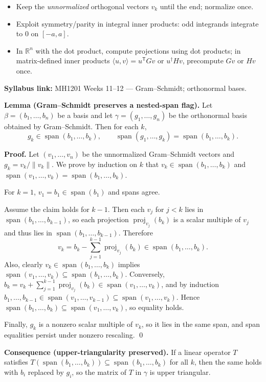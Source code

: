 \begin{examtip}[title={Exam Focus: running Gram--Schmidt efficiently}]
\begin{itemize}[leftmargin=*]
\item Keep the \emph{unnormalized} orthogonal vectors $v_k$ until the end; normalize once.
\item Exploit symmetry/parity in integral inner products: odd integrands integrate to $0$ on $[-a,a]$.
\item In $\mathbb{R}^n$ with the dot product, compute projections using dot products; in matrix-defined inner products $\langle u,v\rangle=u^{\mathsf T}Gv$ or $u^\dagger Hv$, precompute $Gv$ or $Hv$ once.
\end{itemize}
\end{examtip}

\begin{extension}[title={Extension (Tutorial 10, Question 2, Method 1)}]
\textbf{Syllabus link:} MH1201 Weeks 11--12 --- Gram--Schmidt; orthonormal bases.

\textbf{Lemma (Gram--Schmidt preserves a nested-span flag).}
Let $\beta=(b_1,\dots,b_n)$ be a basis and let $\gamma=(g_1,\dots,g_n)$ be the orthonormal basis obtained by Gram--Schmidt.
Then for each $k$,
\[
g_k\in \operatorname{span}(b_1,\dots,b_k),
\qquad
\operatorname{span}(g_1,\dots,g_k)=\operatorname{span}(b_1,\dots,b_k).
\]

\textbf{Proof.}
Let $(v_1,\dots,v_n)$ be the unnormalized Gram--Schmidt vectors and $g_k=v_k/\|v_k\|$.
We prove by induction on $k$ that $v_k\in \operatorname{span}(b_1,\dots,b_k)$ and
$\operatorname{span}(v_1,\dots,v_k)=\operatorname{span}(b_1,\dots,b_k)$.

For $k=1$, $v_1=b_1\in \operatorname{span}(b_1)$ and spans agree.

Assume the claim holds for $k-1$. Then each $v_j$ for $j<k$ lies in $\operatorname{span}(b_1,\dots,b_{k-1})$,
so each projection $\operatorname{proj}_{v_j}(b_k)$ is a scalar multiple of $v_j$ and thus lies in $\operatorname{span}(b_1,\dots,b_{k-1})$.
Therefore
\[
v_k=b_k-\sum_{j=1}^{k-1}\operatorname{proj}_{v_j}(b_k)\in \operatorname{span}(b_1,\dots,b_k).
\]
Also, clearly $v_k\in \operatorname{span}(b_1,\dots,b_k)$ implies $\operatorname{span}(v_1,\dots,v_k)\subseteq \operatorname{span}(b_1,\dots,b_k)$.
Conversely, $b_k=v_k+\sum_{j=1}^{k-1}\operatorname{proj}_{v_j}(b_k)\in \operatorname{span}(v_1,\dots,v_k)$, and by induction
$b_1,\dots,b_{k-1}\in \operatorname{span}(v_1,\dots,v_{k-1})\subseteq \operatorname{span}(v_1,\dots,v_k)$.
Hence $\operatorname{span}(b_1,\dots,b_k)\subseteq \operatorname{span}(v_1,\dots,v_k)$, so equality holds.

Finally, $g_k$ is a nonzero scalar multiple of $v_k$, so it lies in the same span, and span equalities persist under nonzero rescaling. \qed

\textbf{Consequence (upper-triangularity preserved).}
If a linear operator $T$ satisfies $T(\operatorname{span}(b_1,\dots,b_k))\subseteq \operatorname{span}(b_1,\dots,b_k)$ for all $k$,
then the same holds with $b_i$ replaced by $g_i$, so the matrix of $T$ in $\gamma$ is upper triangular.
\end{extension}

